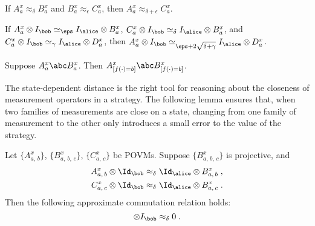 \begin{fact}
\hypertarget{000X}{}
\reversemarginpar{}
  \label{fact:triangle}
  If $A_a^x \approx_\delta B_a^x$ and $B_a^x \approx_\epsilon C_a^x$, then
  $A_a^x \approx_{\delta + \epsilon} C_a^x$.
\end{fact}

\begin{fact}
\hypertarget{000Y}{}
\reversemarginpar{}
 \label{fact:triangle-for-simeq}
 If $A_a^x \otimes I_\bob \simeq_\eps I_\alice \otimes B_a^x$,
 $C_a^x \otimes I_\bob \simeq_\delta I_\alice \otimes  B_a^x$,
 and $C_a^x \otimes I_\bob \simeq_\gamma I_\alice \otimes  D_a^x$,
 then $A_a^x \otimes I_\bob \simeq_{\eps + 2\sqrt{\delta + \gamma}} I_\alice \otimes  D_a^x$.
\end{fact}

\begin{fact}
\hypertarget{000Z}{}
\reversemarginpar{}
  \label{fact:data-processing}
  Suppose $A^x_a \abc B^x_a$.
  Then $A^x_{[f(\cdot) = b]} \abc B^x_{[f(\cdot) = b]}$.
\end{fact}


The state-dependent distance is the right tool for reasoning about the closeness
of measurement operators in a strategy.
The following lemma ensures that, when two families of measurements are close on a
state, changing from one family of measurement to the other only introduces
a small error to the value of the strategy.

\begin{lemma}
\hypertarget{0010}{}
\reversemarginpar{}
  \label{lem:commutation-analysis}
  Let $\{A^x_{a,\, b}\}$, $\{B^x_{a,\, b,\, c}\}$, $\{C^x_{a,\, c}\}$ be POVMs.
  Suppose $\{B^x_{a,\, b,\, c}\}$ is projective, and
  \begin{align*}
    A^x_{a,\, b} \otimes \Id_\bob &\approx_\delta \Id_\alice \otimes B^x_{a,\, b}\;,\\
    C^x_{a,\, c} \otimes \Id_\bob &\approx_\delta \Id_\alice \otimes B^x_{a,\, c}\;.
  \end{align*}
  Then the following approximate commutation relation holds:
  \begin{equation*}
    [A^x_{a,\, b}, C^x_{a,\, c}] \otimes I_\bob \approx_\delta 0\;.
  \end{equation*}
\end{lemma}

